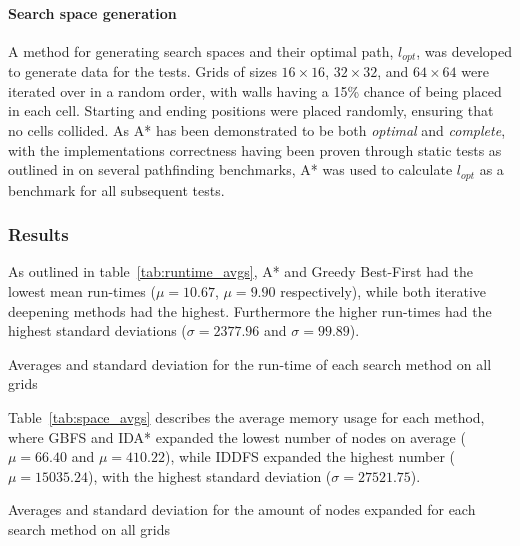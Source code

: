 \paragraph{Search space generation} %
\label{par:search_space_generation}
A method for generating search spaces and their optimal path, $l_{opt}$, was developed to generate data for the tests. Grids of sizes $16 \times 16$, $32 \times 32$, and $64 \times 64$ were iterated over in a random order, with walls having a 15\% chance of being placed in each cell. Starting and ending positions were placed randomly, ensuring that no cells collided. As A* has been demonstrated to be both \textit{optimal} and \textit{complete}, with the implementations correctness having been proven through static tests as outlined in  on several pathfinding benchmarks, A* was used to calculate $l_{opt}$ as a benchmark for all subsequent tests.


\subsubsection{Results} %
\label{sub:results}
As outlined in table~\ref{tab:runtime_avgs}, A* and Greedy Best-First had the lowest mean run-times ($\mu=10.67$, $\mu=9.90$ respectively), while both iterative deepening methods had the highest. Furthermore the higher run-times had the highest standard deviations ($\sigma=2377.96$ and $\sigma=99.89$).

\begin{table}[H]
	\centering
	
	\caption{Averages and standard deviation for the run-time of each search method on all grids}
	\label{tab:runtime_avgs}
\end{table}

Table~\ref{tab:space_avgs} describes the average memory usage for each method, where GBFS and IDA* expanded the lowest number of nodes on average ($\mu=66.40$ and $\mu=410.22$), while IDDFS expanded the highest number ($\mu=15035.24$), with the highest standard deviation ($\sigma=27521.75$).

\begin{table}[H]
	\centering
	
	\caption{Averages and standard deviation for the amount of nodes expanded for each search method on all grids}
	\label{tab:space_avgs}
\end{table}

